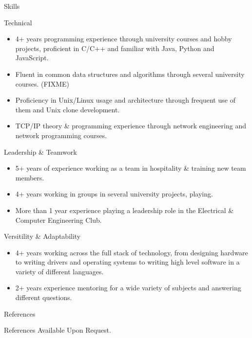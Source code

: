 \documentclass[]{mcdowellcv}
\begin{document}
	\begin{cvsection}{Skills}
		\begin{cvsubsection}{Technical}{}{}
			\begin{itemize}
				\item 4+ years programming experience through university courses and hobby projects, proficient in C/C++ and familiar with Java, Python and JavaScript.
				\item Fluent in common data structures and algorithms through several university courses. (FIXME)
				\item Proficiency in Unix/Linux usage and architecture through frequent use of them and Unix clone development.
				\item TCP/IP theory \& programming experience through network engineering and network programming courses.
			\end{itemize}
		\end{cvsubsection}
		\begin{cvsubsection}{Leadership \& Teamwork}{}{}
			\begin{itemize}
				\item 5+ years of experience working as a team in hospitality \& training new team members.
				\item 4+ years working in groups in several university projects, playing.
				\item More than 1 year experience playing a leadership role in the Electrical \& Computer Engineering Club.
			\end{itemize}
		\end{cvsubsection}
		\begin{cvsubsection}{Versitility \& Adaptability}{}{}
			\begin{itemize}
				\item 4+ years working across the full stack of technology, from designing hardware to writing drivers and
				 operating systems to writing high level software in a variety of different languages.
				\item 2+ years experience mentoring for a wide variety of subjects and answering different questions.
			\end{itemize}
		\end{cvsubsection}
	\end{cvsection}

	\begin{cvsection}{References}
		\begin{cvsubsection}{}{}{}
			References Available Upon Request.
		\end{cvsubsection}
	\end{cvsection}
\end{document}
